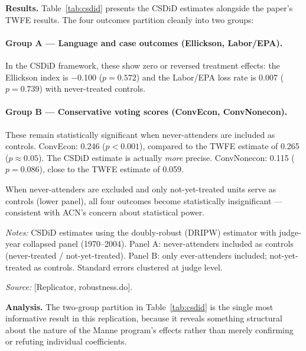 \documentclass[12pt,a4paper]{article}
\begin{document}
\textbf{Results.} Table~\ref{tab:csdid} presents the CSDiD estimates alongside the paper's TWFE results. The four outcomes partition cleanly into two groups:

\paragraph{Group A --- Language and case outcomes (Ellickson, Labor/EPA).} In the CSDiD framework, these show zero or reversed treatment effects: the Ellickson index is $-$0.100 ($p = 0.572$) and the Labor/EPA loss rate is 0.007 ($p = 0.739$) with never-treated controls.

\paragraph{Group B --- Conservative voting scores (ConvEcon, ConvNonecon).} These remain statistically significant when never-attenders are included as controls. ConvEcon: 0.246 ($p < 0.001$), compared to the TWFE estimate of 0.265 ($p \approx 0.05$). The CSDiD estimate is actually \emph{more} precise. ConvNonecon: 0.115 ($p = 0.086$), close to the TWFE estimate of 0.059.

When never-attenders are excluded and only not-yet-treated units serve as controls (lower panel), all four outcomes become statistically insignificant --- consistent with ACN's concern about statistical power.

\begin{table}[htbp]
\centering
\caption{CSDiD (Callaway \& Sant'Anna 2021) vs.\ Paper TWFE}
\label{tab:csdid}
\small
\begin{threeparttable}

\begin{tablenotes}
\item {\small \textit{Notes:} CSDiD estimates using the doubly-robust (DRIPW) estimator with judge-year collapsed panel (1970--2004). Panel A: never-attenders included as controls (never-treated / not-yet-treated). Panel B: only ever-attenders included; not-yet-treated as controls. Standard errors clustered at judge level.}
\item {\small \textit{Source:} [Replicator, robustness.do].}
\end{tablenotes}
\end{threeparttable}
\end{table}

\textbf{Analysis.} The two-group partition in Table~\ref{tab:csdid} is the single most informative result in this replication, because it reveals something structural about the nature of the Manne program's effects rather than merely confirming or refuting individual coefficients.
\end{document}
